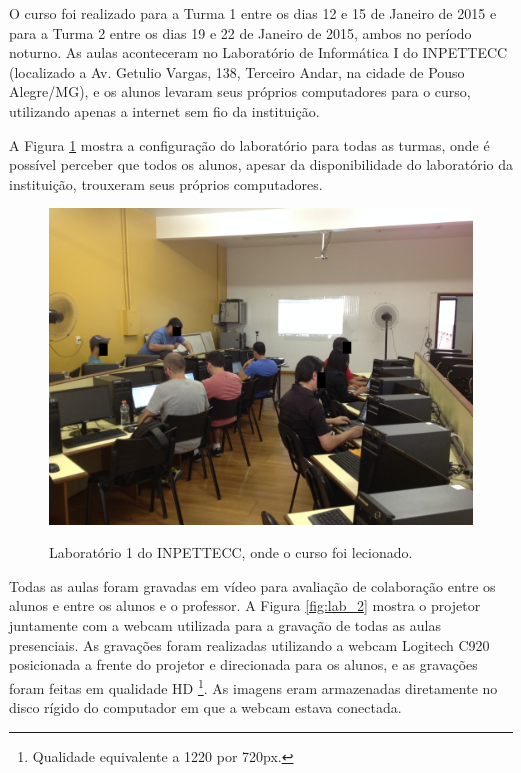 O curso foi realizado para a Turma 1 entre os dias 12 e 15 de Janeiro de 2015 e para a Turma 2 entre os dias 19 e 22 de Janeiro de 2015, ambos no período noturno.  As aulas aconteceram no Laboratório de Informática I do INPETTECC (localizado a Av. Getulio Vargas, 138, Terceiro Andar, na cidade de Pouso Alegre/MG), e os alunos levaram seus próprios computadores para o curso, utilizando apenas a internet sem fio da instituição.

A Figura \ref{fig:lab_1} mostra a configuração do laboratório para todas as turmas, onde é possível perceber que todos os alunos, apesar da disponibilidade do laboratório da instituição, trouxeram seus próprios computadores.

\begin{figure}[!h]
\centering
\caption{Laboratório 1 do INPETTECC, onde o curso foi lecionado.}
\includegraphics[width=1.0\textwidth]{imgs/lab_1.jpg}
\label{fig:lab_1} 
\end{figure}

Todas as aulas foram gravadas em vídeo para avaliação de colaboração entre os alunos e entre os alunos e o professor. A Figura \ref{fig:lab_2} mostra o projetor juntamente com a webcam utilizada para a gravação de todas as aulas presenciais. As gravações foram realizadas utilizando a webcam Logitech C920 posicionada a frente do projetor e direcionada para os alunos, e as gravações foram feitas em qualidade HD \footnote{Qualidade equivalente a 1220 por 720px.}. As imagens eram armazenadas diretamente no disco rígido do computador em que a webcam estava conectada.

